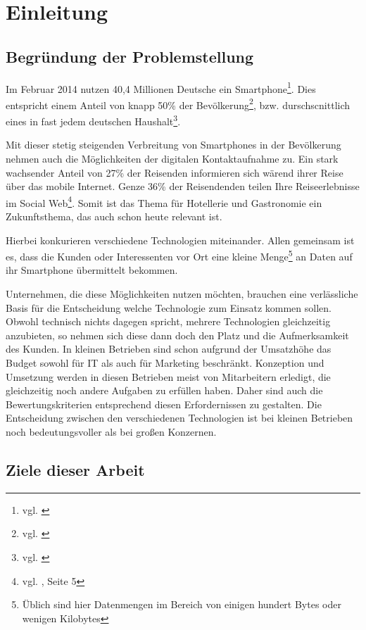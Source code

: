 \section{Einleitung}
\label{sec:einleitung}

\subsection{Begründung der Problemstellung}

Im Februar 2014 nutzen 40,4 Millionen Deutsche ein Smartphone\footnote{vgl. \cite{netzoekonom}}. Dies entspricht einem Anteil von knapp 50\% der Bevölkerung\footnote{vgl. \cite{destatis:bev}}, bzw. durschscnittlich eines in fast jedem deutschen Haushalt\footnote{vgl. \cite{destatis:hh}}. 

Mit dieser stetig steigenden Verbreitung von Smartphones in der Bevölkerung nehmen auch die Möglichkeiten der digitalen Kontaktaufnahme zu. 
Ein stark wachsender Anteil von 27\% der Reisenden informieren sich wärend ihrer Reise über das mobile Internet. Genze 36\% der Reisendenden  teilen Ihre Reiseerlebnisse im Social Web\footnote{vgl. \cite{reiseanalyse}, Seite 5}. Somit ist das Thema für Hotellerie und Gastronomie ein Zukunftsthema, das auch schon heute relevant ist.

Hierbei konkurieren verschiedene Technologien miteinander. Allen gemeinsam ist es, dass die Kunden oder Interessenten vor Ort eine kleine Menge\footnote{Üblich sind hier Datenmengen im Bereich von einigen hundert Bytes oder wenigen Kilobytes} an Daten auf ihr Smartphone übermittelt bekommen.

Unternehmen, die diese Möglichkeiten nutzen möchten, brauchen eine verlässliche Basis für die Entscheidung welche Technologie zum Einsatz kommen sollen. Obwohl technisch nichts dagegen spricht, mehrere Technologien gleichzeitig anzubieten, so nehmen sich diese dann doch den Platz und die Aufmerksamkeit des Kunden. In kleinen Betrieben sind schon aufgrund der Umsatzhöhe das Budget sowohl für IT als auch für Marketing beschränkt. Konzeption und Umsetzung werden in diesen Betrieben meist von Mitarbeitern erledigt, die gleichzeitig noch andere Aufgaben zu erfüllen haben. Daher sind auch die Bewertungskriterien entsprechend diesen Erfordernissen zu gestalten. Die Entscheidung zwischen den verschiedenen Technologien ist bei kleinen Betrieben noch bedeutungsvoller als bei großen Konzernen.

\subsection{Ziele dieser Arbeit}

